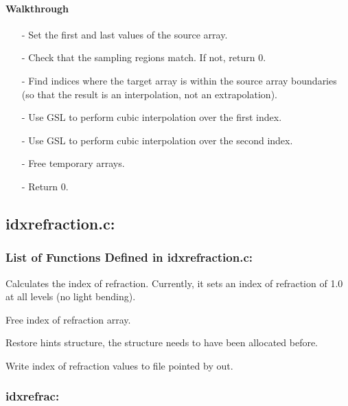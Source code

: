 \documentclass[letterpaper,12pt]{article}
\begin{document}
\paragraph{Walkthrough}
\begin{enumerate}[leftmargin=10pt, noitemsep, parsep=0pt, topsep=0ex]
\item[-] Set the first and last values of the source array.
\item[-] Check that the sampling regions match. If not, return 0.
\item[-] Find indices where the target array is within the source array boundaries (so that the result is an interpolation, not an extrapolation).
\item[-] Use GSL to perform cubic interpolation over the first index.
\item[-] Use GSL to perform cubic interpolation over the second index.
\item[-] Free temporary arrays.
\item[-] Return 0.
\end{enumerate}

\newpage
\subsection{idxrefraction.c:}
\subsubsection{List of Functions Defined in idxrefraction.c:}
Calculates the index of refraction.  Currently, it sets an index of
refraction of 1.0 at all levels (no light bending). \newline

Free index of refraction array. \newline

Restore hints structure, the structure needs to have been
allocated before. \newline

Write index of refraction values to file pointed by out. \newline

\subsubsection{idxrefrac:}
\end{document}
